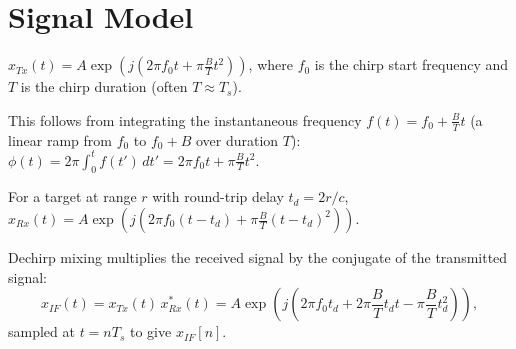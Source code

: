 \section{Signal Model}

\begin{definition}
$x_{Tx}(t) = A\exp\left(j\left(2\pi f_0 t + \pi\frac{B}{T}t^2\right)\right)$, where $f_0$ is the chirp start frequency and $T$ is the chirp duration (often $T \approx T_s$).
\end{definition}
This follows from integrating the instantaneous frequency $f(t) = f_0 + \frac{B}{T}t$ (a linear ramp from $f_0$ to $f_0 + B$ over duration $T$): $\phi(t) = 2\pi\int_0^t f(t')\,dt' = 2\pi f_0 t + \pi\frac{B}{T}t^2$.

\begin{definition}
For a target at range $r$ with round-trip delay $t_d = 2r/c$, $x_{Rx}(t) = A\exp\left(j\left(2\pi f_0(t-t_d) + \pi\frac{B}{T}(t-t_d)^2\right)\right)$.
\end{definition}

\begin{definition}
Dechirp mixing multiplies the received signal by the conjugate of the transmitted signal:
$$x_{IF}(t) = x_{Tx}(t)\,x_{Rx}^*(t) = A\exp\left(j\left(2\pi f_0 t_d + 2\pi\frac{B}{T}t_d t - \pi\frac{B}{T}t_d^2\right)\right),$$
sampled at $t = nT_s$ to give $x_{IF}[n]$.
\end{definition}

